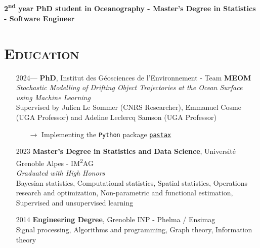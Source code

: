 \documentclass{article}
\begin{document}
\\[.1 cm]

\begin{center}
    \large{\textbf{2\textsuperscript{nd} year PhD student in Oceanography - Master's Degree in Statistics - Software Engineer}}
\end{center}

\section*{\textsc{Education}}
\begin{itemize}
    \item[] 2024— \tabto{2cm} \textbf{PhD}, Institut des Géosciences de l'Environnement - Team \textbf{MEOM} \\[.1 cm]
    \tabto{2cm} \textit{Stochastic Modelling of Drifting Object Trajectories at the Ocean Surface using Machine Learning} \\[.1 cm]
    \tabto{2cm} Supervised by Julien Le Sommer (CNRS Researcher), Emmanuel Cosme (UGA Professor) and \tabto{2cm} Adeline Leclercq Samson (UGA Professor)
    \vspace{-.1 cm}
    \begin{itemize}[left=2cm]
        \item[$\rightarrow$] Implementing the \texttt{Python} package \href{https://github.com/vadmbertr/pastax}{\texttt{pastax}}
    \end{itemize}
    \item[] 2023 \tabto{2cm} \textbf{Master’s Degree in Statistics and Data Science}, Université Grenoble Alpes - IM\textsuperscript{2}AG \\[.15 cm]
    \tabto{2cm} \textit{Graduated with High Honors} \\[.1 cm]
    \tabto{2cm} Bayesian statistics, Computational statistics, Spatial statistics, Operations research and optimization, \tabto{2cm} Non-parametric and functional estimation, Supervised and unsupervised learning
    \item[] 2014 \tabto{2cm} \textbf{Engineering Degree}, Grenoble INP - Phelma / Ensimag \\[.1 cm]
    \tabto{2cm} Signal processing, Algorithms and programming, Graph theory, Information theory
\end{itemize}
\end{document}

